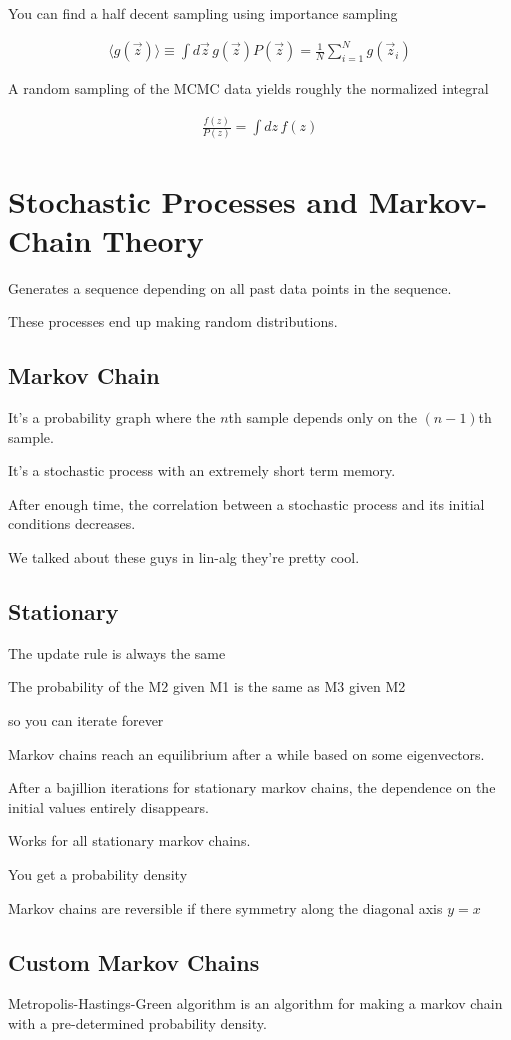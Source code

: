 \documentclass[fleqn]{report}
\newcommand{\equations} [1] {
\begin{gather*}
#1
\end{gather*}
}
\begin{document}
You can find a half decent sampling using importance sampling 
\equations{
    \langle g(\vec z) \rangle 
    \equiv 
    \int d \vec z \, 
    g(\vec z) P(\vec z)
    =
    \frac{1}{N}
    \sum^N_{i = 1}
    g(\vec z_i)
}

A random sampling of the MCMC data yields roughly the normalized integral 
\equations{
    \frac{f(z)}{P(z)} = \int dz \, f(z)
}

\section{Stochastic Processes and Markov-Chain Theory}
Generates a sequence depending on all past data points in the sequence.

These processes end up making random distributions. 

\subsection{Markov Chain}
It's a probability graph where the $n$th sample depends only on the $(n-1)$th 
sample. 

It's a stochastic process with an extremely short term memory.

After enough time, the correlation between a stochastic process 
and its initial conditions decreases.

We talked about these guys in lin-alg they're pretty cool.

\subsection{Stationary}
The update rule is always the same 

The probability of the M2 given M1 is the same as M3 given M2 

so you can iterate forever 

Markov chains reach an equilibrium after a while based on some eigenvectors. 

After a bajillion iterations for stationary markov chains, the 
dependence on the initial values entirely disappears. 

Works for all stationary markov chains.

You get a probability density 

Markov chains are reversible if there symmetry along the diagonal axis $y=x$

\subsection{Custom Markov Chains}
Metropolis-Hastings-Green algorithm is an algorithm for making a 
markov chain with a pre-determined probability density.
\end{document}
